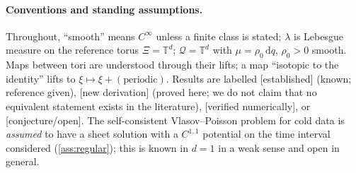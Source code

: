 \documentclass[11pt,a4paper]{article}
\numberwithin{equation}{section}
\theoremstyle{definition}
\theoremstyle{remark}
\newcommand{\T}{\mathbb{T}}
\newcommand{\Q}{\mathcal{Q}}
\newcommand{\dd}{\mathrm{d}}
\newcommand{\status}[1]{\textnormal{\small[#1]}}
\begin{document}
\paragraph{Conventions and standing assumptions.} Throughout, ``smooth'' means $C^\infty$ unless a finite class
is stated; $\lambda$ is Lebesgue measure on the reference torus $\Xi=\T^d$; $\Q=\T^d$ with $\mu=\rho_0\,\dd q$,
$\rho_0>0$ smooth. Maps between tori are understood through their lifts; a map ``isotopic to the identity''
lifts to $\xi\mapsto\xi+(\text{periodic})$. Results are labelled \status{established} (known; reference given),
\status{new derivation} (proved here; we do not claim that no equivalent statement exists in the literature),
\status{verified numerically}, or \status{conjecture/open}. The self-consistent Vlasov--Poisson problem for
cold data is \emph{assumed} to have a sheet solution with a $C^{1,1}$ potential on the time interval considered
(\cref{ass:regular}); this is known in $d=1$ in a weak sense \cite{ZhengMajda1994} and open in general.







\end{document}
